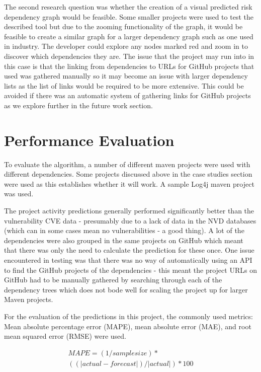\documentclass[conference]{IEEEtran}
\begin{document}
The second research question was whether the creation of a visual predicted risk dependency graph would be feasible. Some smaller projects were used to test the described tool but due to the zooming functionality of the graph, it would be feasible to create a similar graph for a larger dependency graph such as one used in industry. The developer could explore any nodes marked red and zoom in to discover which dependencies they are. The issue that the project may run into in this case is that the linking from dependencies to URLs for GitHub projects that used was gathered manually so it may become an issue with larger dependency lists as the list of links would be required to be more extensive. This could be avoided if there was an automatic system of gathering links for GitHub projects as we explore further in the future work section. 

\section{Performance Evaluation}

To evaluate the algorithm, a number of different maven projects were used with different dependencies. Some projects discussed above in the case studies section were used as this establishes whether it will work. A sample Log4j maven project was used. 

The project activity predictions generally performed significantly better than the vulnerability CVE data - presumably due to a lack of data in the NVD databases (which can in some cases mean no vulnerabilities - a good thing). A lot of the dependencies were also grouped in the same projects on GitHub which meant that there was only the need to calculate the prediction for these once. One issue encountered in testing was that there was no way of automatically using an API to find the GitHub projects of the dependencies - this meant the project URLs on GitHub had to be manually gathered by searching through each of the dependency trees which does not bode well for scaling the project up for larger Maven projects. 

For the evaluation of the predictions in this project, the commonly used metrics: Mean absolute percentage error (MAPE), mean absolute error (MAE), and root mean squared error (RMSE) were used. 

\begin{multline*}
 MAPE  = (1 / sample size) * \\( ( |actual - forecast| ) / |actual| ) * 100 
\end{multline*}
\end{document}
